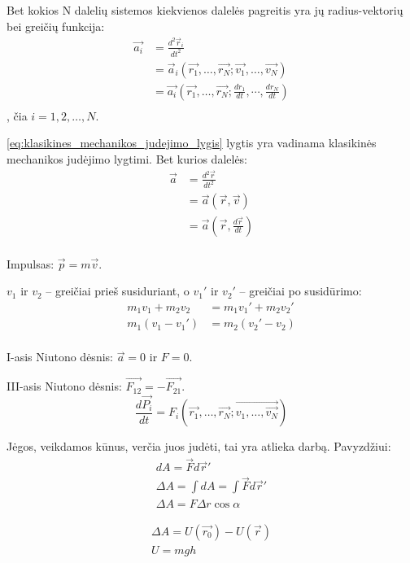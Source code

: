 Bet kokios N dalelių sistemos kiekvienos dalelės pagreitis yra jų
radius-vektorių bei greičių funkcija:
\begin{align}
  \vec{a_{i}}
  &= \frac{d^{2}\vec{r}_{i}}{dt^{2}} \\
  &= \vec{a}_{i}(%
    \vec{r_{1}},\ldots,\vec{r_{N}}; \vec{v_{1}},\ldots,\vec{v_{N}}) \\
  &= \vec{a_{i}} \left(%
    \vec{r_{1}},\ldots,\vec{r_{N}}; %
    \frac{dr_{1}}{dt},\cdots,\frac{dr_{N}}{dt} \right) \\
  \label{eq:klasikines_mechanikos_judejimo_lygis}
\end{align},
čia $i = 1,2,\ldots,N$.

\ref{eq:klasikines_mechanikos_judejimo_lygis} lygtis yra vadinama
klasikinės mechanikos judėjimo lygtimi. Bet kurios dalelės:
\begin{align*}
  \vec{a}
  &= \frac{d^{2}\vec{r}}{dt^{2}} \\
  &= \vec{a}(\vec{r}, \vec{v}) \\
  &= \vec{a} (\vec{r}, \frac{d\vec{r}}{dt}) \\
\end{align*}

Impulsas: $\vec{p} = m\vec{v}$.


$v_{1}$ ir $v_{2}$ – greičiai prieš susiduriant, o
$v_{1}'$ ir $v_{2}'$ – greičiai po susidūrimo:
\begin{align*}
  m_{1}v_{1} + m_{2}v_{2} &= m_{1}v_{1}' + m_{2}v_{2}' \\
  m_{1}(v_{1}-v_{1}') &= m_{2}(v_{2}' - v_{2}) \\
\end{align*}

I-asis Niutono dėsnis: $\vec{a} = 0$ ir $F = 0$.

III-asis Niutono dėsnis: $\vec{F_{12}} = - \vec{F_{21}}$.
\begin{equation*}
  \frac{d\vec{P_{i}}}{dt}
  = F_{i} (\vec{r_{1}},\ldots,\vec{r_{N}}; \vec{v_{1},\ldots,\vec{v_{N}}})
\end{equation*}

Jėgos, veikdamos kūnus, verčia juos judėti, tai yra atlieka darbą.
Pavyzdžiui:
\begin{align*}
  dA = \vec{F}d\vec{r}'\\
  \Delta A = \int dA = \int \vec{F}d\vec{r}' \\
  \Delta A= F \Delta r \cos \alpha
\end{align*}


\begin{align*}
  \Delta A = U(\vec{r_{0}}) - U(\vec{r}) \\
  U = mgh \\
\end{align*}

